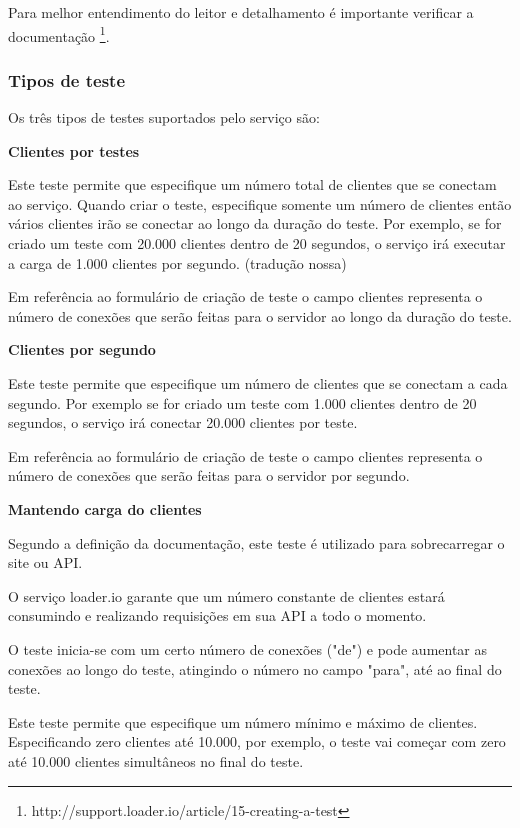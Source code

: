   Para melhor entendimento do leitor e detalhamento é importante verificar 
  a documentação \footnote{http://support.loader.io/article/15-creating-a-test}.
  
\subsubsection{Tipos de teste}
  
  Os três tipos de testes suportados pelo serviço são:
  
  \textbf{Clientes por testes}
  
  Este teste permite que especifique um número total de clientes que se conectam ao serviço. Quando criar o teste,
  especifique somente um número de clientes então vários clientes irão se conectar ao longo da duração do teste. 
  Por exemplo, se for criado um teste com 20.000 clientes dentro de 20 segundos, o serviço irá executar a carga de 
  1.000 clientes por segundo. (tradução nossa)
  
  Em referência ao formulário de criação de teste o campo clientes representa o número de conexões que serão
  feitas para o servidor ao longo da duração do teste.
  
  \textbf{Clientes por segundo}
  
  Este teste permite que especifique um número de clientes que se conectam a cada segundo. Por exemplo se for criado
  um teste com 1.000 clientes dentro de 20 segundos, o serviço irá conectar 20.000 clientes por teste.
  
  Em referência ao formulário de criação de teste o campo clientes representa o número de conexões que serão
  feitas para o servidor por segundo.
  
  \textbf{Mantendo carga do clientes}
  
  Segundo a definição da documentação, este teste é utilizado para sobrecarregar o site ou \ac{API}.
  
  O serviço loader.io garante que um número constante de clientes estará consumindo e realizando requisições em 
  sua \ac{API} a todo o momento.
  
  O teste inicia-se com um certo número de conexões ("de")  e pode aumentar as conexões ao longo do teste, 
  atingindo o número no campo "para", até ao final do teste. 
  
  Este teste permite que especifique um número mínimo e máximo de clientes. Especificando zero clientes
  até 10.000, por exemplo, o teste vai começar com zero até 10.000 clientes simultâneos no final do teste.
  
